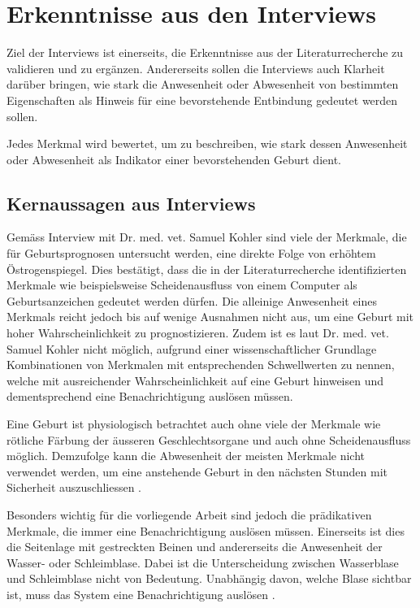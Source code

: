 
\section{Erkenntnisse aus den Interviews}

Ziel der Interviews ist einerseits, die Erkenntnisse aus der Literaturrecherche zu validieren und zu ergänzen. Andererseits sollen die Interviews auch Klarheit darüber bringen, wie stark die Anwesenheit oder Abwesenheit von bestimmten Eigenschaften als Hinweis für eine bevorstehende Entbindung gedeutet werden sollen. 

Jedes Merkmal wird bewertet, um zu beschreiben, wie stark dessen Anwesenheit oder Abwesenheit als Indikator einer bevorstehenden Geburt dient.  


\subsection{Kernaussagen aus Interviews}
Gemäss Interview mit Dr. med. vet. Samuel Kohler \citep{Kohler2020} sind viele der Merkmale, die für Geburtsprognosen untersucht werden, eine direkte Folge von erhöhtem Östrogenspiegel. Dies bestätigt, dass die in der Literaturrecherche identifizierten Merkmale wie beispielsweise Scheidenausfluss von einem Computer als Geburtsanzeichen gedeutet werden dürfen. Die alleinige Anwesenheit eines Merkmals reicht jedoch bis auf wenige Ausnahmen nicht aus, um eine Geburt mit hoher Wahrscheinlichkeit zu prognostizieren. Zudem ist es laut Dr. med. vet. Samuel Kohler nicht möglich, aufgrund einer wissenschaftlicher Grundlage Kombinationen von Merkmalen mit entsprechenden Schwellwerten zu nennen, welche mit ausreichender Wahrscheinlichkeit auf eine Geburt hinweisen und dementsprechend eine Benachrichtigung auslösen müssen.

Eine Geburt ist physiologisch betrachtet auch ohne viele der Merkmale wie rötliche Färbung der äusseren Geschlechtsorgane und auch ohne Scheidenausfluss möglich. Demzufolge kann die Abwesenheit der meisten Merkmale nicht verwendet werden, um eine anstehende Geburt in den nächsten Stunden mit Sicherheit auszuschliessen \citep{Kohler2020}. 

Besonders wichtig für die vorliegende Arbeit sind jedoch die prädikativen Merkmale, die immer eine Benachrichtigung auslösen müssen. Einerseits ist dies die Seitenlage mit gestreckten Beinen und andererseits die Anwesenheit der Wasser- oder Schleimblase. Dabei ist die Unterscheidung zwischen Wasserblase und Schleimblase nicht von Bedeutung. Unabhängig davon, welche Blase sichtbar ist, muss das System eine Benachrichtigung auslösen \citep{Kohler2020}.

